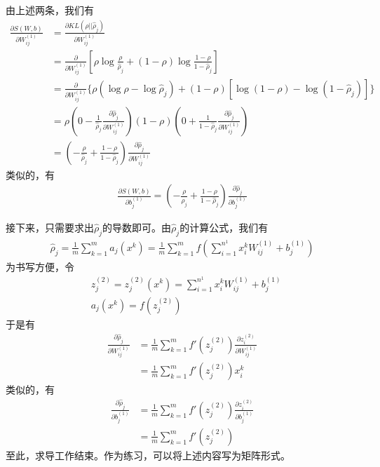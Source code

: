         由上述两条，我们有
        \begin{align*}
        \frac{\partial S(W,b)}{\partial W_{ij}^{(1)}} & = \frac{\partial KL(\rho||\hat{\rho}_j)}{\partial W_{ij}^{(1)}}\\
        & = \frac{\partial }{\partial W_{ij}^{(1)}} \left[ \rho\log\frac{\rho}{\hat{\rho}_j}+ (1-\rho)\log\frac{1-\rho}{1-\hat{\rho}_j}  \right]\\
        &= \frac{\partial }{\partial W_{ij}^{(1)}} \Big\{ \rho(\log\rho - \log \hat{\rho}_j) + (1-\rho)[\log(1-\rho) -\log(1-\hat{\rho}_j)  ]  \Big\}\\
        &= \rho \left( 0- \frac{1}{\hat{\rho}_j} \frac{\partial \hat{\rho}_j}{\partial W_{ij}^{(1)}} \right) (1-\rho) \left( 0+\frac{1}{1-\hat{\rho}_j}\frac{\partial \hat{\rho}_j}{\partial W_{ij}^{(1)}} \right) \\
        &= \left( -\frac{\rho}{\hat{\rho}_j }+ \frac{1-\rho}{1-\hat{\rho}_j} \right) \frac{\partial \hat{\rho}_j}{\partial W_{ij}^{(1)}}
        \end{align*}
        类似的，有
        \begin{align*}
        \frac{\partial S(W,b)}{\partial b_j^{(1)}} =  \left( -\frac{\rho}{\hat{\rho}_j }+ \frac{1-\rho}{1-\hat{\rho}_j} \right) \frac{\partial \hat{\rho}_j}{\partial b_j^{(1)}}
        \end{align*}
        \par
        接下来，只需要求出$\hat\rho_j$的导数即可。由$\hat\rho_j$的计算公式，我们有
        \begin{align*}
        \hat{\rho}_j = \frac{1}{m} \sum_{k=1}^m a_j(x^k) = \frac{1}{m}\sum_{k=1}^m f \left( \sum_{i=1}^{n^1}x^k_i W_{ij}^{(1)}  + b_j^{(1)}\right)
        \end{align*}
        为书写方便，令
        \begin{align*}
        & z_j^{(2)} =z_j^{(2)}(x^k)= \sum_{i=1}^{n^1}x^k_i W_{ij}^{(1)}  + b_j^{(1)}\\
        & a_j(x^k)= f \left( z_j^{(2)} \right)
        \end{align*}
        于是有
        \begin{align*}
        \frac{\partial \hat{\rho}_j}{\partial W_{ij}^{(1)}} & = \frac{1}{m} \sum_{k=1}^m f'\left( z_j^{(2)} \right) \frac{\partial z_i^{(2)}}{\partial W_{ij}^{(1)}}\\
        & = \frac{1}{m} \sum_{k=1}^m f'\left( z_j^{(2)} \right) x_i^k
        \end{align*}
        类似的，有
        \begin{align*}
        \frac{\partial \hat{\rho}_j}{\partial b_j^{(1)}} & = \frac{1}{m} \sum_{k=1}^m f'\left( z_j^{(2)} \right) \frac{\partial z_i^{(2)}}{\partial b_j^{(1)}}\\
        & = \frac{1}{m} \sum_{k=1}^m f'\left( z_j^{(2)} \right)
        \end{align*}
        至此，求导工作结束。作为练习，可以将上述内容写为矩阵形式。
